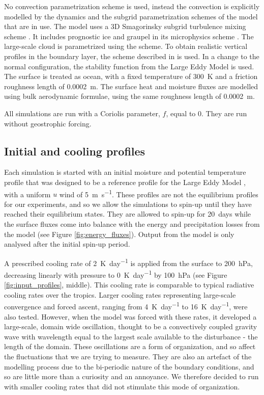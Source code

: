 \documentclass[11pt,a4paper]{article}
\begin{document}
No convection parametrization scheme is used, instead the convection is explicitly modelled by the dynamics and the subgrid parametrization schemes of the model that are in use. The model uses a 3D Smagorinsky subgrid turbulence mixing scheme \parencite{smagorinsky1964some}. It includes prognostic ice and graupel in its microphysics scheme \parencite{wilson1999microphysically}. The large-scale cloud is parametrized using the \cite{smith1990scheme} scheme. To obtain realistic vertical profiles in the boundary layer, the scheme described in \cite{lock2000new} is used. In a change to the normal configuration, the stability function from the Large Eddy Model \parencite{petch2001sensitivity} is used. The surface is treated as ocean, with a fixed temperature of \SI{300}{K} and a friction roughness length of \SI{0.0002}{m}. The surface heat and moisture fluxes are modelled using bulk aerodynamic formulae, using the same roughness length of \SI{0.0002}{m}.

All simulations are run with a Coriolis parameter, $f$, equal to 0. They are run without geostrophic forcing.

\subsection{Initial and cooling profiles}

Each simulation is started with an initial moisture and potential temperature profile that was designed to be a reference profile for the Large Eddy Model \parencite{petch2001sensitivity}, with a uniform $u$ wind of \SI{5}{m.s^{-1}}. These profiles are not the equilibrium profiles for our experiments, and so we allow the simulations to spin-up until they have reached their equilibrium states. They are allowed to spin-up for \SI{20}{days} while the surface fluxes come into balance with the energy and precipitation losses from the model (see Figure \ref{fig:energy_fluxes}). Output from the model is only analysed after the initial spin-up period.

A prescribed cooling rate of \SI{2}{K.day^{-1}} is applied from the surface to \SI{200}{hPa}, decreasing linearly with pressure to \SI{0}{K.day^{-1}} by \SI{100}{hPa} (see Figure \ref{fig:input_profiles}, middle). This cooling rate is comparable to typical radiative cooling rates over the tropics. Larger cooling rates representing large-scale convergence and forced ascent, ranging from \SI{4}{K.day^{-1}} to \SI{16}{K.day^{-1}}, were also tested. However, when the model was forced with these rates, it developed a large-scale, domain wide oscillation, thought to be a convectively coupled gravity wave with wavelength equal to the largest scale available to the disturbance - the length of the domain. These oscillations are a form of organization, and so affect the fluctuations that we are trying to measure. They are also an artefact of the modelling process due to the bi-periodic nature of the boundary conditions, and so are little more than a curiosity and an annoyance. We therefore decided to run with smaller cooling rates that did not stimulate this mode of organization.
\end{document}

